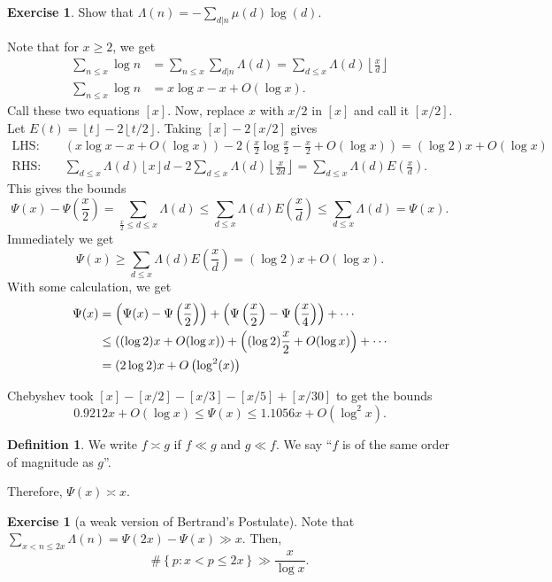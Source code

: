 \documentclass[11pt]{article}
\theoremstyle{definition}
\newtheorem{defn}[thm]{Definition}
\newtheorem{exe}[thm]{Exercise}
\newcommand{\set}[1]{\left\{ #1 \right\}}
\newcommand{\floor}[1]{\left\lfloor #1 \right\rfloor}
\newcommand{\La}[0]{\Lambda}
\begin{document}
\begin{exe}
Show that $\La(n)=-\sum_{d|n}\mu(d)\log(d)$.
\end{exe}

Note that for $x\ge2$, we get
\begin{align}
\sum_{n\le x} \log n &= \sum_{n\le x} \sum_{d|n} \La(d)
= \sum_{d\le x} \La(d)\floor{\frac{x}{d}}
 \label{1840cheby1} \\
\sum_{n\le x} \log n &= x\log x - x + O(\log x) .
 \label{1840cheby2}
\end{align}
Call these two equations $[x]$. Now, replace $x$ with $x/2$ in $[x]$ and call it $[x/2]$.
Let $E(t)=\floor{t}-2\floor{t/2}$. Taking $[x]-2[x/2]$ gives
\begin{align*}
\text{LHS:}&~~~~~
(x\log x - x + O(\log x)) - 2\left(\frac{x}2\log\frac{x}2 - \frac{x}2 + O(\log x)\right)
= (\log2)x + O(\log x) \\
\text{RHS:}&~~~~~
\sum_{d\le x}\La(d)\floor{x}{d} - 2\sum_{d\le x}\La(d)\floor{\frac{x}{2d}}
= \sum_{d\le x} \La(d)E\left(\frac{x}{d}\right) .
\end{align*}
This gives the bounds
\[
\Psi(x)-\Psi\left(\frac{x}{2}\right)
= \sum_{\frac{x}{2}\le d\le x} \La(d)
\le \sum_{d\le x} \La(d)E\left(\frac{x}{d}\right)
\le \sum_{d\le x} \La(d) = \Psi(x) .
\]
Immediately we get
\begin{equation}
\Psi(x)\ge\sum_{d\le x}\La(d)E\left(\frac{x}{d}\right)
= (\log2)x + O(\log x) .
\end{equation}
With some calculation, we get
\begin{align}
\Psi(x) &= \left(\Psi(x)-\Psi\left(\frac{x}{2}\right)\right)
+ \left(\Psi\left(\frac{x}{2}\right)-\Psi\left(\frac{x}{4}\right)\right) + \cdots \notag \\
&\le \left((\log2)x+O(\log x)\right) + \left((\log2)\frac{x}{2}+O(\log x)\right) + \cdots
\notag \\
&= (2\log2)x + O\left(\log^2(x)\right)
\end{align}

Chebyshev took $[x]-[x/2]-[x/3]-[x/5]+[x/30]$ to get the bounds
\[
0.9212x + O(\log x) \le \Psi(x) \le 1.1056x + O(\log^2 x) .
\]

\begin{defn}
We write $f\asymp g$ if $f\ll g$ and $g\ll f$. We say ``$f$ is of the same order of
magnitude as $g$''.
\end{defn}

Therefore, $\Psi(x) \asymp x$.

\begin{exe}[a weak version of Bertrand's Postulate]
Note that $\sum_{x<n\le 2x}\La(n) = \Psi(2x)-\Psi(x)\gg x$. Then,
\[
\#\set{p:x<p\le 2x} \gg \frac{x}{\log x} .
\]
\end{exe}
\end{document}
